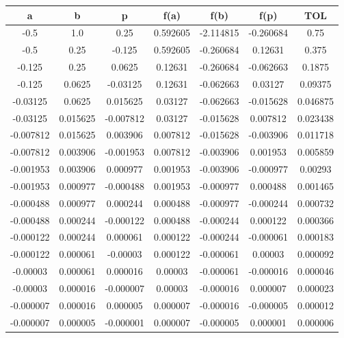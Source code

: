 \documentclass[12pt]{article}
\begin{document}
\begin{enumerate}
\begin{enumerate}[label=\alph*]
        \begin{tabular}{|c|c|c|c|c|c|c|}
            \hline
            \textbf{a} & \textbf{b} & \textbf{p} & \textbf{f(a)} & \textbf{f(b)} & \textbf{f(p)} & \textbf{TOL}\\ \hline
            -0.5 & 1.0 & 0.25 & 0.592605 & -2.114815 & -0.260684 & 0.75 \\
            -0.5 & 0.25 & -0.125 & 0.592605 & -0.260684 & 0.12631 & 0.375 \\
            -0.125 & 0.25 & 0.0625 & 0.12631 & -0.260684 & -0.062663 & 0.1875 \\
            -0.125 & 0.0625 & -0.03125 & 0.12631 & -0.062663 & 0.03127 & 0.09375 \\
            -0.03125 & 0.0625 & 0.015625 & 0.03127 & -0.062663 & -0.015628 & 0.046875 \\
            -0.03125 & 0.015625 & -0.007812 & 0.03127 & -0.015628 & 0.007812 & 0.023438 \\
            -0.007812 & 0.015625 & 0.003906 & 0.007812 & -0.015628 & -0.003906 & 0.011718 \\
            -0.007812 & 0.003906 & -0.001953 & 0.007812 & -0.003906 & 0.001953 & 0.005859 \\
            -0.001953 & 0.003906 & 0.000977 & 0.001953 & -0.003906 & -0.000977 & 0.00293 \\
            -0.001953 & 0.000977 & -0.000488 & 0.001953 & -0.000977 & 0.000488 & 0.001465 \\
            -0.000488 & 0.000977 & 0.000244 & 0.000488 & -0.000977 & -0.000244 & 0.000732 \\
            -0.000488 & 0.000244 & -0.000122 & 0.000488 & -0.000244 & 0.000122 & 0.000366 \\
            -0.000122 & 0.000244 & 0.000061 & 0.000122 & -0.000244 & -0.000061 & 0.000183 \\
            -0.000122 & 0.000061 & -0.00003 & 0.000122 & -0.000061 & 0.00003 & 0.000092 \\
            -0.00003 & 0.000061 & 0.000016 & 0.00003 & -0.000061 & -0.000016 & 0.000046 \\
            -0.00003 & 0.000016 & -0.000007 & 0.00003 & -0.000016 & 0.000007 & 0.000023 \\
            -0.000007 & 0.000016 & 0.000005 & 0.000007 & -0.000016 & -0.000005 & 0.000012 \\
            -0.000007 & 0.000005 & -0.000001 & 0.000007 & -0.000005 & 0.000001 & 0.000006 \\
            \hline
        \end{tabular}
    \end{enumerate}


\end{enumerate}
\end{document}
